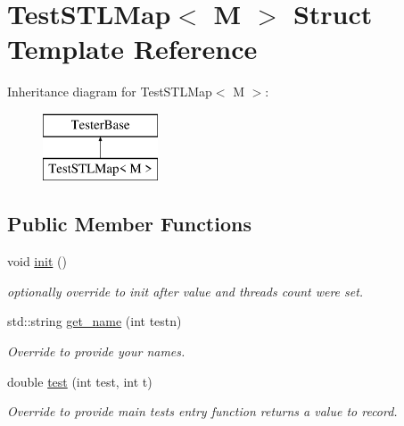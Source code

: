 \hypertarget{structTestSTLMap}{}\section{Test\+S\+T\+L\+Map$<$ M $>$ Struct Template Reference}
\label{structTestSTLMap}
Inheritance diagram for Test\+S\+T\+L\+Map$<$ M $>$\+:\begin{figure}[H]
\begin{center}
\leavevmode
\includegraphics[height=2.000000cm]{structTestSTLMap}
\end{center}
\end{figure}
\subsection*{Public Member Functions}
\begin{DoxyCompactItemize}
\item 
\hypertarget{structTestSTLMap_aa8cd626fc65c2151c783364fea73795d}{}void \hyperlink{structTestSTLMap_aa8cd626fc65c2151c783364fea73795d}{init} ()\label{structTestSTLMap_aa8cd626fc65c2151c783364fea73795d}

\begin{DoxyCompactList}\small\item\em optionally override to init after value and threads count were set. \end{DoxyCompactList}\item 
\hypertarget{structTestSTLMap_a3246ea9287bfa8659663e34e119c5ce0}{}std\+::string \hyperlink{structTestSTLMap_a3246ea9287bfa8659663e34e119c5ce0}{get\+\_\+name} (int testn)\label{structTestSTLMap_a3246ea9287bfa8659663e34e119c5ce0}

\begin{DoxyCompactList}\small\item\em Override to provide your names. \end{DoxyCompactList}\item 
\hypertarget{structTestSTLMap_a3d4738b7f2c5d01bc3723f70a24383f5}{}double \hyperlink{structTestSTLMap_a3d4738b7f2c5d01bc3723f70a24383f5}{test} (int test, int t)\label{structTestSTLMap_a3d4738b7f2c5d01bc3723f70a24383f5}

\begin{DoxyCompactList}\small\item\em Override to provide main test\textquotesingle{}s entry function returns a value to record. \end{DoxyCompactList}\end{DoxyCompactItemize}
